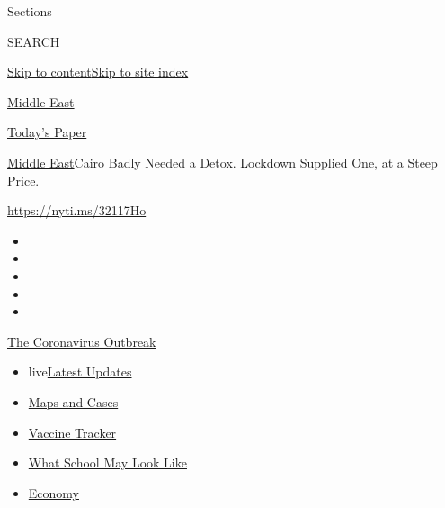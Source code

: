 Sections

SEARCH

\protect\hyperlink{site-content}{Skip to
content}\protect\hyperlink{site-index}{Skip to site index}

\href{https://www.nytimes3xbfgragh.onion/section/world/middleeast}{Middle
East}

\href{https://myaccount.nytimes3xbfgragh.onion/auth/login?response_type=cookie\&client_id=vi}{}

\href{https://www.nytimes3xbfgragh.onion/section/todayspaper}{Today's
Paper}

\href{/section/world/middleeast}{Middle East}\textbar{}Cairo Badly
Needed a Detox. Lockdown Supplied One, at a Steep Price.

\url{https://nyti.ms/32117Ho}

\begin{itemize}
\item
\item
\item
\item
\item
\end{itemize}

\href{https://www.nytimes3xbfgragh.onion/news-event/coronavirus?action=click\&pgtype=Article\&state=default\&region=TOP_BANNER\&context=storylines_menu}{The
Coronavirus Outbreak}

\begin{itemize}
\tightlist
\item
  live\href{https://www.nytimes3xbfgragh.onion/2020/08/01/world/coronavirus-covid-19.html?action=click\&pgtype=Article\&state=default\&region=TOP_BANNER\&context=storylines_menu}{Latest
  Updates}
\item
  \href{https://www.nytimes3xbfgragh.onion/interactive/2020/us/coronavirus-us-cases.html?action=click\&pgtype=Article\&state=default\&region=TOP_BANNER\&context=storylines_menu}{Maps
  and Cases}
\item
  \href{https://www.nytimes3xbfgragh.onion/interactive/2020/science/coronavirus-vaccine-tracker.html?action=click\&pgtype=Article\&state=default\&region=TOP_BANNER\&context=storylines_menu}{Vaccine
  Tracker}
\item
  \href{https://www.nytimes3xbfgragh.onion/interactive/2020/07/29/us/schools-reopening-coronavirus.html?action=click\&pgtype=Article\&state=default\&region=TOP_BANNER\&context=storylines_menu}{What
  School May Look Like}
\item
  \href{https://www.nytimes3xbfgragh.onion/live/2020/07/31/business/stock-market-today-coronavirus?action=click\&pgtype=Article\&state=default\&region=TOP_BANNER\&context=storylines_menu}{Economy}
\end{itemize}

